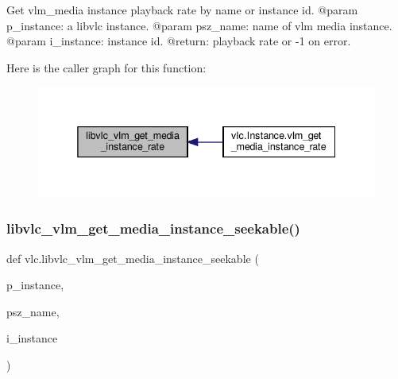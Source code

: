 \begin{DoxyVerb}Get vlm_media instance playback rate by name or instance id.
@param p_instance: a libvlc instance.
@param psz_name: name of vlm media instance.
@param i_instance: instance id.
@return: playback rate or -1 on error.
\end{DoxyVerb}
 Here is the caller graph for this function\+:
\nopagebreak
\begin{figure}[H]
\begin{center}
\leavevmode
\includegraphics[width=338pt]{namespacevlc_a27709abc252d4ddc97dc2ea272a85acf_icgraph}
\end{center}
\end{figure}
\mbox{\label{namespacevlc_aeb4b8ac59f98ba964d1963665404ee8d}} 
\subsubsection{\texorpdfstring{libvlc\+\_\+vlm\+\_\+get\+\_\+media\+\_\+instance\+\_\+seekable()}{libvlc\_vlm\_get\_media\_instance\_seekable()}}
{\footnotesize\ttfamily def vlc.\+libvlc\+\_\+vlm\+\_\+get\+\_\+media\+\_\+instance\+\_\+seekable (\begin{DoxyParamCaption}\item[{}]{p\+\_\+instance,  }\item[{}]{psz\+\_\+name,  }\item[{}]{i\+\_\+instance }\end{DoxyParamCaption})}

